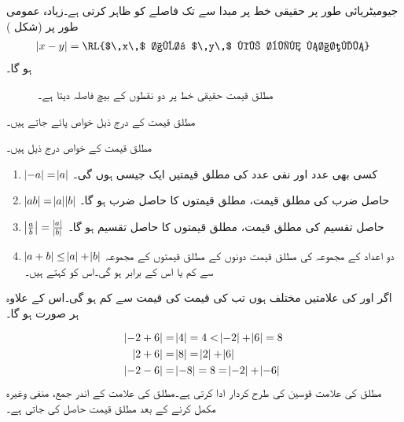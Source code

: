 جیومیٹریائی طور پر حقیقی خط پر مبدا  سے  تک فاصلے کو  ظاہر کرتی ہے۔زیادہ عمومی طور پر (شکل ) 
\begin{align*}
\abs{x-y}=\text{\RL{$\,x\,$ اور $\,y\,$ کے بیچ فاصلہ}}
\end{align*}
ہو گا۔
\begin{figure}
\centering
{}
\caption{مطلق قیمت حقیقی خط پر دو نقطوں کے بیچ فاصلہ دیتا ہے۔}
\label{شکل_ابتدائی_مطلق_جیومیٹریائی_مطلب}
\end{figure}
مطلق قیمت کے درج ذیل خواص پائے جاتے ہیں۔

مطلق قیمت کے خواص درج ذیل ہیں۔
\begin{enumerate}[1.]
\item{$\abs{-a}=\abs{a}$}\quad
کسی بھی عدد اور نفی عدد  کی مطلق قیمتیں ایک جیسی ہوں گی۔
\item{$\abs{ab}=\abs{a}\abs{b}$}\quad
حاصل ضرب کی مطلق قیمت، مطلق قیمتوں کا حاصل ضرب ہو گا۔
\item{$\abs{\frac{a}{b}}=\frac{\abs{a}}{\abs{b}}$}\quad
حاصل تقسیم کی مطلق قیمت، مطلق قیمتوں کا حاصل تقسیم ہو گا۔
\item{$\abs{a+b}\le \abs{a}+\abs{b}$}\quad
دو اعداد کے مجموعہ کی مطلق قیمت دونوں کے مطلق قیمتوں کے مجموعہ سے کم یا اس کے برابر ہو گی۔اس کو  کہتے ہیں۔
\end{enumerate}


اگر  اور  کی علامتیں مختلف ہوں تب  کی قیمت  کی قیمت سے کم ہو گی۔اس کے علاوہ ہر صورت  ہو گا۔

\begin{align*}
\abs{-2+6}&=\abs{4}=4<\abs{-2}+\abs{6}=8\\
\abs{2+6}&=\abs{8}=\abs{2}+\abs{6}\\
\abs{-2-6}&=\abs{-8}=8=\abs{-2}+\abs{-6}
\end{align*}
مطلق کی علامت قوسین کی طرح کردار ادا کرتی ہے۔مطلق کی علامت کے اندر جمع، منفی وغیرہ مکمل کرنے کے بعد مطلق قیمت حاصل کی جاتی ہے۔

